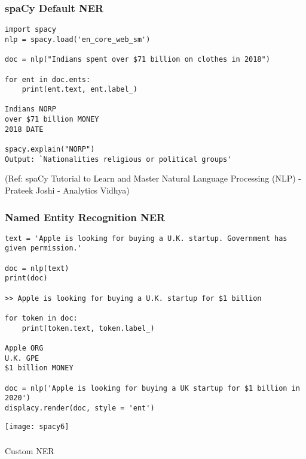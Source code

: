 \begin{frame}[fragile]\frametitle{spaCy Default NER}

\begin{lstlisting}
import spacy
nlp = spacy.load('en_core_web_sm')

doc = nlp("Indians spent over $71 billion on clothes in 2018")
 
for ent in doc.ents:
    print(ent.text, ent.label_)
		
Indians NORP
over $71 billion MONEY
2018 DATE

spacy.explain("NORP")
Output: `Nationalities religious or political groups'
\end{lstlisting}
	
	{\tiny (Ref: spaCy Tutorial to Learn and Master Natural Language Processing (NLP) - Prateek Joshi - Analytics Vidhya)}
\end{frame}


\begin{frame}[fragile]\frametitle{Named Entity Recognition NER}

\begin{lstlisting}
text = 'Apple is looking for buying a U.K. startup. Government has given permission.'

doc = nlp(text)
print(doc)

>> Apple is looking for buying a U.K. startup for $1 billion

for token in doc:
    print(token.text, token.label_)

Apple ORG
U.K. GPE
$1 billion MONEY

doc = nlp('Apple is looking for buying a UK startup for $1 billion in 2020')
displacy.render(doc, style = 'ent')
\end{lstlisting}

\begin{center}
\texttt{[image: spacy6]}
\end{center}

\end{frame}


\begin{frame}[fragile]\frametitle{}

\begin{center}
{\Large Custom NER}
\end{center}
\end{frame}

